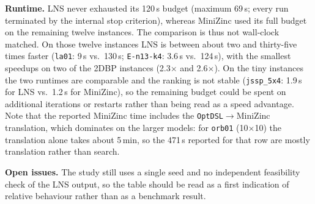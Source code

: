 \documentclass[11pt,a4paper]{article}
\begin{document}
\textbf{Runtime.}
LNS never exhausted its 120\,s budget (maximum 69\,s; every run terminated
by the internal stop criterion), whereas MiniZinc used its full budget on the
remaining twelve instances.
The comparison is thus not wall-clock matched.
On those twelve instances LNS is between about two and thirty-five times
faster (\texttt{la01}: 9\,s vs.\ 130\,s; \texttt{E-n13-k4}: 3.6\,s vs.\
124\,s), with the smallest speedups on two of the 2DBP instances
(2.3$\times$ and 2.6$\times$).
On the tiny instances the two runtimes are comparable and the ranking is not
stable (\texttt{jssp\_5x4}: 1.9\,s for LNS vs.\ 1.2\,s for MiniZinc), so the
remaining budget could be spent on additional iterations or restarts rather
than being read as a speed advantage.
Note that the reported MiniZinc time includes the \texttt{OptDSL}$\to$MiniZinc
translation, which dominates on the larger models: for \texttt{orb01}
(10$\times$10) the translation alone takes about 5\,min, so the 471\,s
reported for that row are mostly translation rather than search.

\textbf{Open issues.}
The study still uses a single seed and no independent feasibility check of
the LNS output, so the table should be read as a first indication of relative
behaviour rather than as a benchmark result.
\end{document}
